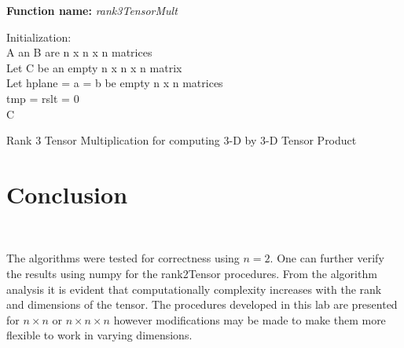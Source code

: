 \documentclass[10pt,journal]{article}
\begin{document}
\begin{algorithm}[H]
\SetAlgoLined
\textbf{Function name:} \emph{rank3TensorMult}

Initialization\::\\ 
 A an B are n x n x n matrices\\
 Let C be an empty n x n x n matrix\\
 Let hplane = a = b be empty n x n matrices\\
 tmp = rslt = 0\\

\Return C

\caption{Rank 3 Tensor Multiplication for computing 3-D by 3-D Tensor Product}
\end{algorithm}
\section{Conclusion}\

The algorithms were tested for correctness using $n=2$.
One can further verify the results using numpy for the rank2Tensor procedures. From the algorithm analysis it is evident that computationally complexity increases with the rank and dimensions of the tensor. The procedures developed in this lab are presented for $n\times n$ or $n\times n\times n$ however modifications may be made to make them more flexible to work in varying dimensions.


\end{document}
